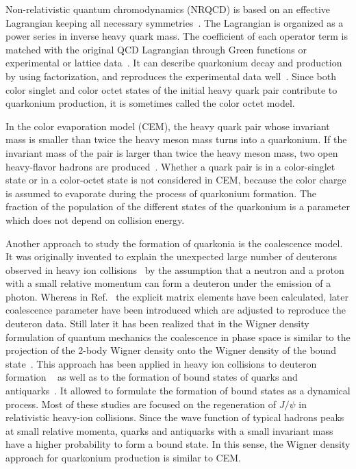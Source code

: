 \documentclass[twocolumn,aps,superscriptaddress,showpacs,nofootinbib,floatfix]{revtex4}
\begin{document}
Non-relativistic quantum chromodynamics (NRQCD) is based on an effective Lagrangian keeping all necessary symmetries~\cite{Caswell:1985ui}. The Lagrangian is organized as a power series in inverse heavy quark mass.
The coefficient of each operator term is matched with the original QCD Lagrangian through Green functions or experimental or lattice data~\cite{Pineda:2011dg}. It can describe quarkonium decay and production by using factorization, and reproduces the experimental data well~\cite{Bodwin:1994jh,Shao:2014yta}.
Since both color singlet and color octet states of the initial heavy quark pair contribute to quarkonium production, it is sometimes called the color octet model.

In the color evaporation model (CEM), the heavy quark pair whose invariant mass is smaller than twice the heavy meson mass turns into a quarkonium. If the invariant mass of the pair is larger than twice the heavy meson mass, two open heavy-flavor hadrons are produced~\cite{Fritzsch:1977ay,Halzen:1977rs,Gluck:1977zm,Barger:1979js,Amundson:1996qr}.
Whether a quark pair is in a color-singlet state or in a color-octet state is not considered in CEM, because the color charge is assumed to evaporate during the process of quarkonium formation.
The fraction of the population of the different states of the quarkonium is a parameter which does not depend on collision energy.

Another approach to study the formation of quarkonia is the coalescence model. It was originally invented to explain the unexpected large number of deuterons observed in heavy ion collisions~\cite{Butler:1961pr,Butler:1963pp,Schwarzschild:1963zz} by the assumption that a neutron and a proton with a small relative momentum can form a deuteron under the emission of a photon. Whereas in Ref.~\cite{Butler:1961pr,Butler:1963pp,Schwarzschild:1963zz} the explicit matrix elements have been calculated, later coalescence parameter have been introduced \cite{Gutbrod:1988gt} which are adjusted to reproduce the deuteron data. Still later it has been realized that in the Wigner density formulation of quantum mechanics the coalescence in phase space is similar to the projection of the 2-body Wigner density onto the Wigner density of the bound state~\cite{Baltz:1995tv,Greco:2003xt,Greco:2003mm,Song:2016lfv}.
This approach has been applied in heavy ion collisions to deuteron formation ~ \cite{Remler:1981du,Gyulassy:1982pe,Aichelin:1987rh} as well as to the formation of bound states of quarks and antiquarks~\cite{Baltz:1995tv,Greco:2003xt,Greco:2003mm,Zhang:2006yf, Kahana:2010md,Han:2016uhh}. It allowed to formulate the formation of bound states as a dynamical process. Most of these studies are focused on the regeneration of $J/\psi$ in relativistic heavy-ion collisions. Since the wave function of typical hadrons peaks at small relative momenta, quarks and antiquarks with a small invariant mass have a higher probability to form a bound state.  In this sense, the Wigner density approach for quarkonium production is similar to CEM.
\end{document}
